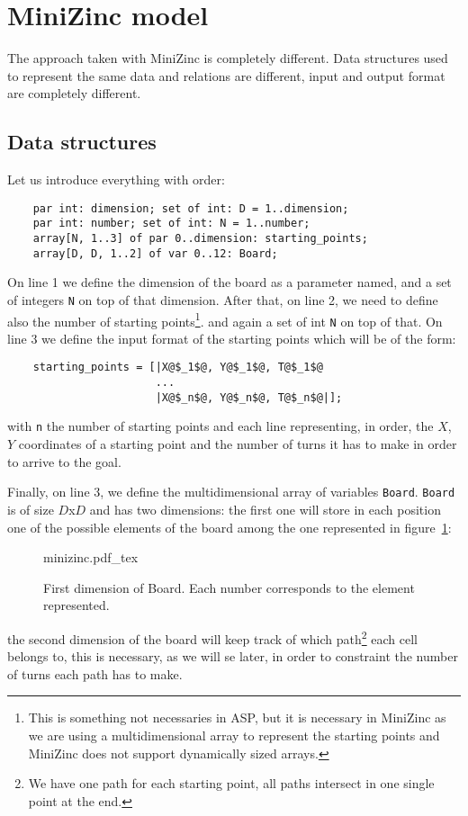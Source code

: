 \section{MiniZinc model}
The approach taken with MiniZinc is completely different. Data structures used to represent the same data and relations are different, input and output format are completely different.
\subsection{Data structures}
Let us introduce everything with order:
\begin{verbatim}
    par int: dimension; set of int: D = 1..dimension; 
    par int: number; set of int: N = 1..number; 
    array[N, 1..3] of par 0..dimension: starting_points; 
    array[D, D, 1..2] of var 0..12: Board;
\end{verbatim}

On line 1 we define the dimension of the board as a parameter named, and a set of integers \texttt{N} on top of that dimension.
After that, on line 2, we need to define also the number of starting points\footnote{This is something not necessaries in ASP, but it is necessary in MiniZinc as we are using a multidimensional array to represent the starting points and MiniZinc does not support dynamically sized arrays.}. and again a set of int \texttt{N} on top of that.
On line 3 we define the input format of the starting points which will be of the form:
\begin{verbatim}
    starting_points = [|X@$_1$@, Y@$_1$@, T@$_1$@
                       ...
                       |X@$_n$@, Y@$_n$@, T@$_n$@|];
\end{verbatim}
with  \texttt{n} the number of starting points and each line representing, in order, the $X$, $Y$ coordinates of a starting point and the number of turns it has to make in order to arrive to the goal.

Finally, on line 3, we define the multidimensional array of variables \texttt{Board}. \texttt{Board} is of size $D$x$D$ and has two dimensions: the first one will store in each position one of the possible elements of the board among the one represented in figure~\ref{figm:board}:
\begin{figure}[h!]
    \centering
    \def\svgwidth{\columnwidth}
    {minizinc.pdf_tex}
    \caption{First dimension of Board. Each number corresponds to the element represented.}
    \label{figm:board}
\end{figure}
the second dimension of the board will keep track of which path\footnote{We have one path for each starting point, all paths intersect in one single point at the end.} each cell belongs to, this is necessary, as we will se later, in order to constraint the number of turns each path has to make.



